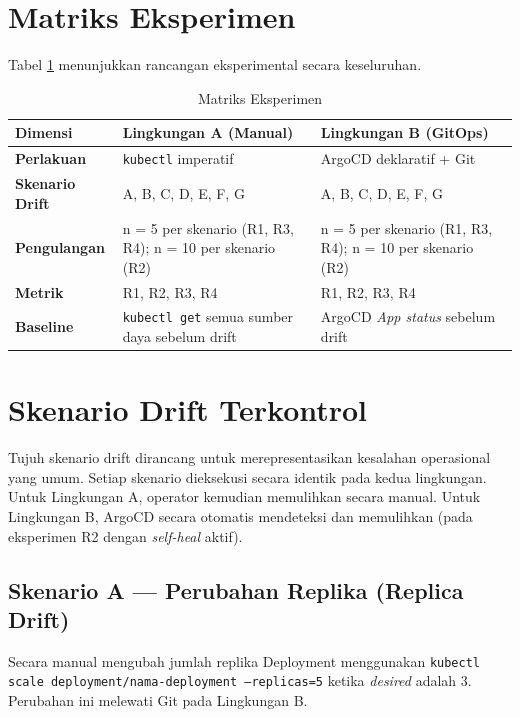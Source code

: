 \section{Matriks Eksperimen}

Tabel \ref{tab:matriks-eksperimen} menunjukkan rancangan eksperimental secara keseluruhan.

\begin{table}[H]
  \centering
  \caption{Matriks Eksperimen}
  \label{tab:matriks-eksperimen}
  \begin{tabular}{|p{2.5cm}|p{5cm}|p{5cm}|}
    \hline
    \textbf{Dimensi} & \textbf{Lingkungan A (Manual)} & \textbf{Lingkungan B (GitOps)} \\
    \hline
    \textbf{Perlakuan} & \texttt{kubectl} imperatif & ArgoCD deklaratif + Git \\
    \hline
    \textbf{Skenario Drift} & A, B, C, D, E, F, G & A, B, C, D, E, F, G \\
    \hline
    \textbf{Pengulangan} & n = 5 per skenario (R1, R3, R4); n = 10 per skenario (R2) & n = 5 per skenario (R1, R3, R4); n = 10 per skenario (R2) \\
    \hline
    \textbf{Metrik} & R1, R2, R3, R4 & R1, R2, R3, R4 \\
    \hline
    \textbf{Baseline} & \texttt{kubectl get} semua sumber daya sebelum drift & ArgoCD \textit{App status} sebelum drift \\
    \hline
  \end{tabular}
\end{table}

\section{Skenario Drift Terkontrol}

Tujuh skenario drift dirancang untuk merepresentasikan kesalahan operasional yang umum. Setiap skenario dieksekusi secara identik pada kedua lingkungan. Untuk Lingkungan A, operator kemudian memulihkan secara manual. Untuk Lingkungan B, ArgoCD secara otomatis mendeteksi dan memulihkan (pada eksperimen R2 dengan \textit{self-heal} aktif).

\subsection{Skenario A --- Perubahan Replika (Replica Drift)}
Secara manual mengubah jumlah replika Deployment menggunakan \texttt{kubectl scale deployment/nama-deployment --replicas=5} ketika \textit{desired} adalah 3. Perubahan ini melewati Git pada Lingkungan B.

